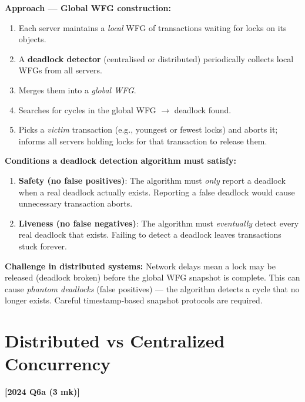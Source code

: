 \documentclass[11pt,a4paper]{article}
\newcommand{\qref}[1]{\textbf{\textcolor{examblue}{[#1]}}}
\newcommand{\mk}[1]{\textcolor{slidegray}{\small(#1 mk)}}
\newcommand{\key}[1]{\textbf{\textcolor{keyred}{#1}}}
\begin{document}
\begin{answerbox}
\textbf{Approach --- Global WFG construction:}
\begin{enumerate}
  \item Each server maintains a \emph{local} WFG of transactions waiting for locks on its objects.
  \item A \textbf{deadlock detector} (centralised or distributed) periodically collects local WFGs from all servers.
  \item Merges them into a \emph{global WFG}.
  \item Searches for cycles in the global WFG $\to$ deadlock found.
  \item Picks a \emph{victim} transaction (e.g., youngest or fewest locks) and aborts it; informs all servers holding locks for that transaction to release them.
\end{enumerate}

\textbf{Conditions a deadlock detection algorithm must satisfy:}
\begin{enumerate}
  \item \key{Safety (no false positives)}: The algorithm must \emph{only} report a deadlock when a real deadlock actually exists. Reporting a false deadlock would cause unnecessary transaction aborts.
  \item \key{Liveness (no false negatives)}: The algorithm must \emph{eventually} detect every real deadlock that exists. Failing to detect a deadlock leaves transactions stuck forever.
\end{enumerate}

\textbf{Challenge in distributed systems:} Network delays mean a lock may be released (deadlock broken) before the global WFG snapshot is complete. This can cause \emph{phantom deadlocks} (false positives) --- the algorithm detects a cycle that no longer exists. Careful timestamp-based snapshot protocols are required.
\end{answerbox}

\section{Distributed vs Centralized Concurrency}
\qref{2024 Q6a \mk{3}}
\end{document}
